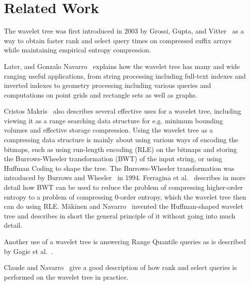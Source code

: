 \section{Related Work}
The wavelet tree was first introduced in 2003 by Grossi, Gupta, and Vitter~ as a way to obtain faster rank and select query times on compressed suffix arrays while maintaining empirical entropy compression.

Later, and Gonzalo Navarro~ explains how the wavelet tree has many and wide ranging useful applications, from string processing including full-text indexes and inverted indexes to geometry processing including various queries and computations on point grids and rectangle sets as well as graphs.

Cristos Makris~ also describes several effective uses for a wavelet tree, including viewing it as a range searching data structure for e.g. minimum bounding volumes and effective storage compression.
Using the wavelet tree as a compressing data structure is mainly about using various ways of encoding the bitmaps, such as using run-length encoding (RLE) on the bitmaps and storing the Burrows-Wheeler transformation (BWT) of the input string, or using Huffman Coding to shape the tree.
The Burrows-Wheeler transformation was introduced by Burrows and Wheeler~ in 1994.
Ferragina et al.~ describes in more detail how BWT can be used to reduce the problem of compressing higher-order entropy to a problem of compressing 0-order entropy, which the wavelet tree then can do using RLE.
Mäkinen and Navarro~ invented the Huffman-shaped wavelet tree and describes in short the general principle of it without going into much detail.

Another use of a wavelet tree is answering Range Quantile queries as is described by Gagie et al.~.



Claude and Navarro~ give a good description of how rank and select queries is performed on the wavelet tree in practice.